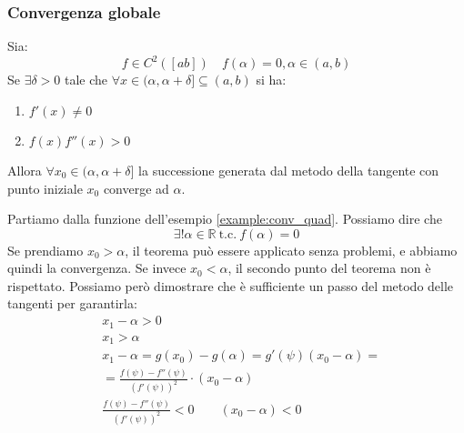 \subsubsection{Convergenza globale}
\begin{theorem}
	Sia:
	\begin{equation*}
		f \in C^2([ab]) \quad f(\alpha)=0, \alpha \in (a,b)
	\end{equation*}
	Se $\exists \delta > 0$ tale che $\forall x \in (\alpha, \alpha + \delta] \subseteq (a,b)$ si ha:
	\begin{enumerate}
		\item $f'(x) \neq 0$
		\item $f(x)f''(x)>0$
	\end{enumerate}
	Allora $\forall x_0 \in (\alpha, \alpha + \delta]$ la successione generata dal metodo della tangente con punto iniziale $x_0$ converge ad $\alpha$.
\end{theorem}
\begin{demostration}
	Partiamo dalla funzione dell'esempio \ref{example:conv_quad}. Possiamo dire che
	\begin{equation*}
		\exists ! \alpha\in \mathbb{R} \: \text{t.c.} \: f(\alpha)=0
	\end{equation*}
	Se prendiamo $x_0 > \alpha$, il teorema può essere applicato senza problemi, e abbiamo quindi la convergenza. Se invece $x_0 < \alpha$, il secondo punto del teorema non è rispettato. Possiamo però dimostrare che è sufficiente un passo del metodo delle tangenti per garantirla:
	\begin{align*}
		& x_1 - \alpha > 0 \\
		& x_1 > \alpha \\
		& x_1 - \alpha = g(x_0) - g(\alpha) = g'(\psi)(x_0 - \alpha) = \\
		& = \frac{f(\psi)-f''(\psi)}{(f'(\psi))^2} \cdot (x_0 - \alpha) \\
		& \frac{f(\psi)-f''(\psi)}{(f'(\psi))^2} < 0 \quad\quad (x_0 - \alpha) < 0
	\end{align*}
\end{demostration}


